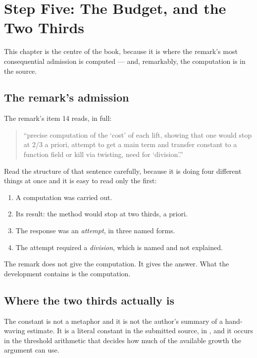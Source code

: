 
\chapter{Step Five: The Budget, and the Two Thirds}
\label{ch:budget}

This chapter is the centre of the book, because it is where the remark's
most consequential admission is computed --- and, remarkably, the computation is
in the source.

\section{The remark's admission}The remark's item 14 reads, in full:

\begin{quote}
\small
``precise computation of the `cost' of each lift, showing that one would stop at
2/3 a priori, attempt to get a main term and transfer constant to a function
field or kill via twisting, need for `division'.''
\end{quote}

Read the structure of that sentence carefully, because it is doing four
different things at once and it is easy to read only the first:

\begin{enumerate}
\item A computation was carried out.
\item Its result: the method would stop at two thirds, a priori.
\item The response was an \emph{attempt}, in three named forms.
\item The attempt required a \emph{division}, which is named and not explained.
\end{enumerate}

The remark does not give the computation. It gives the answer. What the
development contains is the computation.

\section{Where the two thirds actually is}The constant is not a metaphor and it is not the author's summary of a
hand-waving estimate. It is a literal constant in the submitted source, in
, and it occurs in
the threshold arithmetic that decides how much of the available growth the
argument can use.


